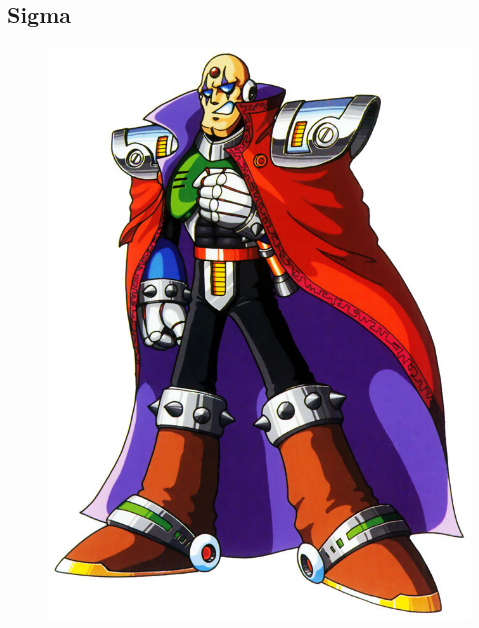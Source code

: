 \subsection{Sigma}\label{boss:Sigma_x1}
\begin{figure}[htp]
	\centering
	\includegraphics[height=\portraitsize]{figures/X1/Sigma_stages/Sigma.jpg}

\end{figure}
